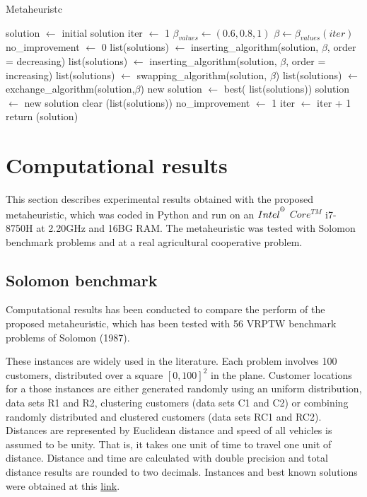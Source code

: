 \begin{algorithm}[H]
\caption{Metaheuristc}
\label{main}
\begin{algorithmic}[1]
	\STATE solution $\leftarrow$ initial solution
	\STATE iter $\leftarrow$ 1
	\STATE $\beta_{values} \leftarrow (0.6, 0.8, 1)$          																	  
	\STATE $\beta \leftarrow \beta_{values}(iter)$
	\STATE no\_improvement  $\leftarrow$ 0
	\STATE  list(solutions) $ \leftarrow$ inserting\_algorithm(solution, $\beta$, order = decreasing)			
	\STATE  list(solutions) $ \leftarrow$ inserting\_algorithm(solution, $\beta$, order = increasing)			
	\STATE  list(solutions) $ \leftarrow$ swapping\_algorithm(solution, $\beta$)				
	\STATE  list(solutions) $ \leftarrow$ exchange\_algorithm(solution,$\beta$)							
	\STATE  new solution $ \leftarrow$ best( list(solutions))
	\STATE solution $\leftarrow$ new solution
	\STATE clear (list(solutions)) 
	\ELSE 
	\STATE  no\_improvement $\leftarrow$  1 
	\ENDIF
	\ENDWHILE
	\STATE iter $\leftarrow$ iter + 1 
	\ENDWHILE
	\STATE return (solution)
\end{algorithmic}
\end{algorithm}



\section{Computational results}\label{results}
This section describes experimental results obtained with the proposed metaheuristic, which was coded in Python and run on an $Intel^{\textsuperscript{\textregistered}}$ $Core^{TM}$ i7-8750H at 2.20GHz and 16BG RAM. The metaheuristic was tested with Solomon benchmark problems and at a real agricultural cooperative problem.

\subsection{Solomon benchmark}
Computational results has been conducted to compare the perform of the proposed metaheuristic, which has been tested with 56 VRPTW benchmark problems of Solomon (1987). 

These instances are widely used in the literature. Each problem involves 100 customers, distributed over a square $[0,100]^{2}$ in the plane. Customer locations for a those instances are either generated randomly using an uniform distribution, data sets R1 and R2, clustering customers (data sets C1 and C2) or combining randomly distributed and clustered customers (data sets RC1 and RC2).
Distances are represented by Euclidean distance and speed of all vehicles is assumed to be unity. That is, it takes one unit of time to travel one unit of distance. Distance and time are calculated with double precision and total distance results are rounded to two decimals. Instances and best known solutions were obtained at this \href{https://www.sintef.no/projectweb/top/vrptw/solomon-benchmark/100-customers/}{link}. 

